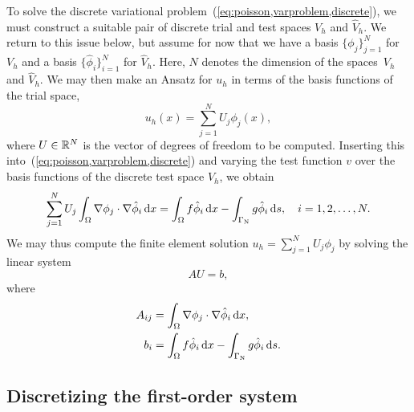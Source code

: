To solve the discrete variational
problem~(\ref{eq:poisson,varproblem,discrete}), we must construct a
suitable pair of discrete trial and test spaces $V_h$ and $\hat{V}_h$.
We return to this issue below, but assume for now that we have a basis
$\{\phi_j\}_{j=1}^N$ for $V_h$ and a basis $\{\hat{\phi}_i\}_{i=1}^N$
for $\hat{V}_h$. Here, $N$ denotes the dimension of the spaces~$V_h$ and $\hat{V}_h$.
We may then make an Ansatz for $u_h$ in terms of the basis functions
of the trial space,
%
\begin{equation}
  u_h(x) = \sum_{j=1}^N U_j \phi_j(x),
\end{equation}
where $U \in \mathbb{R}^N$ is the vector of degrees of freedom to be computed.
Inserting this into~(\ref{eq:poisson,varproblem,discrete}) and varying
the test function $v$ over the basis functions of the discrete test
space $\hat{V}_h$, we obtain
\begin{equation}
  \sum_{j=1}^N U_j \int_{\Omega} \nabla \phi_j \cdot \nabla \hat{\phi}_i \, \mathrm{d}x =
  \int_{\Omega} f \hat{\phi}_i \, \mathrm{d}x - \int_{\Gamma_{\mathrm{N}}} g \hat{\phi}_i \, \mathrm{d}s,
  \quad i = 1,2,\ldots,N.
\end{equation}
We may thus compute the finite element solution $u_h = \sum_{j=1}^N
U_j \phi_j$ by solving the linear system
\begin{equation}
  AU = b,
\end{equation}
where
\begin{equation}
\begin{split}
  A_{ij} &= \int_{\Omega} \nabla \phi_j \cdot \nabla \hat{\phi}_i \, \mathrm{d}x,
  \\
  b_i &= \int_{\Omega} f \hat{\phi}_i \, \mathrm{d}x - \int_{\Gamma_{\mathrm{N}}} g \hat{\phi}_i \, \mathrm{d}s.
\end{split}
\end{equation}

\subsection{Discretizing the first-order system}
\label{sec:kirby-7:mixed}

